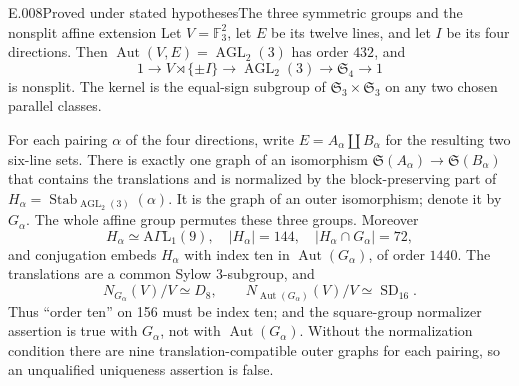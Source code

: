 \begin{saresult}{E.008}{Proved under stated hypotheses}{The three symmetric groups and the nonsplit affine extension}
Let $V=\mathbb F_3^2$, let $E$ be its twelve lines, and let $I$ be its
four directions. Then $\operatorname{Aut}(V,E)=\operatorname{AGL}_2(3)$
has order $432$, and
\[
1\longrightarrow V\rtimes\{\pm I\}
 \longrightarrow\operatorname{AGL}_2(3)
 \longrightarrow\mathfrak S_4\longrightarrow1
\]
is nonsplit. The kernel is the equal-sign subgroup of
$\mathfrak S_3\times\mathfrak S_3$ on any two chosen parallel classes.

For each pairing $\alpha$ of the four directions, write
$E=A_\alpha\amalg B_\alpha$ for the resulting two six-line sets.
There is exactly one graph of an isomorphism
$\mathfrak S(A_\alpha)\longrightarrow\mathfrak S(B_\alpha)$ that
contains the translations and is normalized by the block-preserving
part of $H_\alpha=\operatorname{Stab}_{\operatorname{AGL}_2(3)}(\alpha)$.
It is the graph of an outer isomorphism; denote it by $G_\alpha$.
The whole affine group permutes these three groups. Moreover
\[
H_\alpha\simeq\mathrm{A}\Gamma\mathrm{L}_1(9),\quad
|H_\alpha|=144,\quad |H_\alpha\cap G_\alpha|=72,
\]
and conjugation embeds $H_\alpha$ with index ten in
$\operatorname{Aut}(G_\alpha)$, of order $1440$. The translations are a
common Sylow $3$-subgroup, and
\[
N_{G_\alpha}(V)/V\simeq D_8,\qquad
N_{\operatorname{Aut}(G_\alpha)}(V)/V\simeq\operatorname{SD}_{16}.
\]
Thus ``order ten'' on 156 must be index ten; and the square-group
normalizer assertion is true with $G_\alpha$, not with
$\operatorname{Aut}(G_\alpha)$. Without the normalization condition
there are nine translation-compatible outer graphs for each pairing,
so an unqualified uniqueness assertion is false.
\end{saresult}
